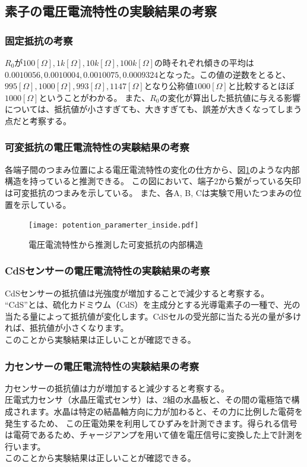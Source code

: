 \documentclass[11pt,dvipdfmx]{jarticle}
\begin{document}
	\subsection{素子の電圧電流特性の実験結果の考察}
	\subsubsection{固定抵抗の考察}
	$R_0$が$100[\Omega], 1k[\Omega], 10k[\Omega], 100k[\Omega]$の時それぞれ傾きの平均は
	$0.0010056, 0.0010004, 0.0010075, 0.0009324$となった。この値の逆数をとると、
	$995[\Omega], 1000[\Omega], 993[\Omega], 1147[\Omega]$となり公称値$1000[\Omega]$と比較するとほぼ$1000[\Omega]$ということがわかる。
	また、$R_0$の変化が算出した抵抗値に与える影響については、抵抗値が小さすぎても、大きすぎても、誤差が大きくなってしまう点だと考察する。

	\subsubsection{可変抵抗の電圧電流特性の実験結果の考察}
	各端子間のつまみ位置による電圧電流特性の変化の仕方から、図\ref{fig:potention-inside}のような内部構造を持っていると推測できる。
	この図において、端子2から繋がっている矢印は可変抵抗のつまみを示している。
	また、各A, B, Cは実験で用いたつまみの位置を示している。
	\begin{figure}[H]
		\centering
		\texttt{[image: potention\_paramerter\_inside.pdf]}
		\caption{電圧電流特性から推測した可変抵抗の内部構造}
		\label{fig:potention-inside}
	\end{figure}

	\subsubsection{CdSセンサーの電圧電流特性の実験結果の考察}
	CdSセンサーの抵抗値は光強度が増加することで減少すると考察する。\\
	“CdS”とは、硫化カドミウム（CdS）を主成分とする光導電素子の一種で、光の当たる量によって抵抗値が変化します。CdSセルの受光部に当たる光の量が多ければ、抵抗値が小さくなります。\cite{x}\\
	このことから実験結果は正しいことが確認できる。

	\subsubsection{力センサーの電圧電流特性の実験結果の考察}
	力センサーの抵抗値は力が増加すると減少すると考察する。\\
	圧電式力センサ（水晶圧電式センサ）は、2組の水晶板と、その間の電極箔で構成されます。水晶は特定の結晶軸方向に力が加わると、その力に比例した電荷を発生するため、
	この圧電効果を利用してひずみを計測できます。得られる信号は電荷であるため、チャージアンプを用いて値を電圧信号に変換した上で計測を行います。\cite{b}\\
	このことから実験結果は正しいことが確認できる。
\end{document}
